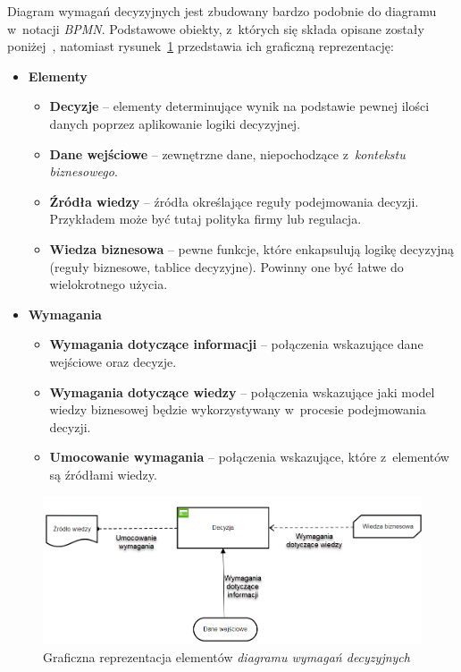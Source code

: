 Diagram wymagań decyzyjnych jest zbudowany bardzo podobnie do diagramu w~notacji \emph{BPMN}. Podstawowe obiekty, z~których się składa opisane zostały poniżej~\cite{DMNArticle}, natomiast rysunek~\ref{fig:dmnElements} przedstawia ich graficzną reprezentację:
\begin{itemize}
    \item \textbf{Elementy}
        \begin{itemize}
            \item \textbf{Decyzje} -- elementy determinujące wynik na podstawie pewnej ilości danych poprzez aplikowanie logiki decyzyjnej. 
            \item \textbf{Dane wejściowe} -- zewnętrzne dane, niepochodzące z~\emph{kontekstu biznesowego}. 
            \item \textbf{Źródła wiedzy} -- źródła określające reguły podejmowania decyzji. Przykładem może być tutaj polityka firmy lub regulacja.
            \item \textbf{Wiedza biznesowa} -- pewne funkcje, które enkapsulują logikę decyzyjną (reguły biznesowe, tablice decyzyjne). Powinny one być łatwe do wielokrotnego użycia.
        \end{itemize}
    \item \textbf{Wymagania}
        \begin{itemize}
            \item \textbf{Wymagania dotyczące informacji} -- połączenia wskazujące dane wejściowe oraz decyzje.
            \item \textbf{Wymagania dotyczące wiedzy} -- połączenia wskazujące jaki model wiedzy biznesowej będzie wykorzystywany w~procesie podejmowania decyzji.
            \item \textbf{Umocowanie wymagania} -- połączenia wskazujące, które z~elementów są źródłami wiedzy.
        \end{itemize}
\end{itemize}
\begin{figure}
    \centering
    \includegraphics[width=\textwidth,height=0.4\textheight,keepaspectratio]{./assets/dmnElements2.png}
    \caption{Graficzna reprezentacja elementów \emph{diagramu wymagań decyzyjnych}}
    \label{fig:dmnElements}
\end{figure}

